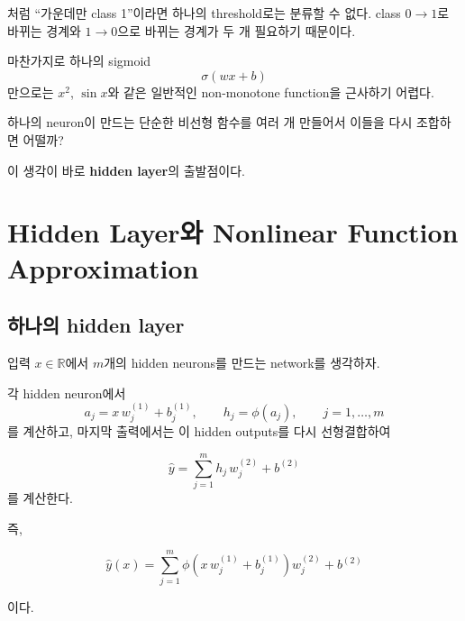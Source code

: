 \documentclass[11pt,a4paper]{article}
\newcommand{\R}{\mathbb{R}}
\newcommand{\sigmoid}{\sigma}
\begin{document}
처럼 ``가운데만 class 1''이라면 하나의 threshold로는 분류할 수 없다.
class $0\to1$로 바뀌는 경계와 $1\to0$으로 바뀌는 경계가 두 개 필요하기 때문이다.

마찬가지로 하나의 sigmoid
\[
\sigmoid(wx+b)
\]
만으로는 $x^2$, $\sin x$와 같은 일반적인 non-monotone function을 근사하기 어렵다.

\begin{thinkbox}
하나의 neuron이 만드는 단순한 비선형 함수를 여러 개 만들어서
이들을 다시 조합하면 어떨까?

이 생각이 바로 \textbf{hidden layer}의 출발점이다.
\end{thinkbox}

\section{Hidden Layer와 Nonlinear Function Approximation}

\subsection{하나의 hidden layer}

입력 $x\in\R$에서 $m$개의 hidden neurons를 만드는 network를 생각하자.

각 hidden neuron에서
\[
a_j=x\,w_j^{(1)}+b_j^{(1)},
\qquad
h_j=\phi(a_j),
\qquad
j=1,\ldots,m
\]
를 계산하고, 마지막 출력에서는 이 hidden outputs를 다시 선형결합하여

\[
\boxed{
\widehat y
=
\sum_{j=1}^{m}
h_j\,w_j^{(2)}+b^{(2)}
}
\]
를 계산한다.

즉,

\[
\boxed{
\widehat y(x)
=
\sum_{j=1}^{m}
\phi\!\left(x\,w_j^{(1)}+b_j^{(1)}\right)
w_j^{(2)}
+b^{(2)}
}
\]

이다.

\begin{center}
\end{center}
\end{document}
